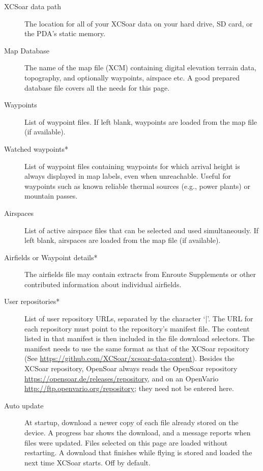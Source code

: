\begin{description}
\item[XCSoar data path]  The location for all of your XCSoar data on your hard drive, 
  SD card, or the PDA's static memory.
\item[Map Database]  The name of the map file (XCM) containing digital elevation
  terrain data, topography, and optionally waypoints, airspace etc. A good
  prepared database file covers all the needs for this page.
\item[Waypoints] List of waypoint files. If left blank, waypoints are loaded
  from the map file (if available).

\item[Watched waypoints*] \label{conf:watched-wps} List of waypoint files containing
  waypoints for which arrival height is always displayed in map labels, even
  when unreachable. Useful for waypoints such as known reliable thermal sources
  (e.g., power plants) or mountain passes.
\item[Airspaces]  List of active airspace files that can be selected and used
  simultaneously.  If left blank,
  airspaces are loaded from the map file (if available).
\item[Airfields or Waypoint details*]  The airfields file may contain extracts from
  Enroute Supplements or other contributed information about individual airfields.
\item[User repositories*] List of user repository URLs, separated by the character `|'.
  The URL for each repository must point to the repository's manifest file. 
  The content listed in that manifest is then included in the file download 
  selectors. The manifest needs to use the same format as that of the XCSoar repository
  (See \url{https://github.com/XCSoar/xcsoar-data-content}).
  Besides the XCSoar repository, OpenSoar always reads the OpenSoar
  repository \url{https://opensoar.de/releases/repository}, and on an
  OpenVario \url{http://ftp.openvario.org/repository}; they need not be
  entered here.
\item[Auto update] At startup, download a newer copy of each file already
  stored on the device. A progress bar shows the download, and a message
  reports when files were updated. Files selected on this page are loaded
  without restarting. A download that finishes while flying is stored and
  loaded the next time XCSoar starts. Off by default.
  
\end{description}


